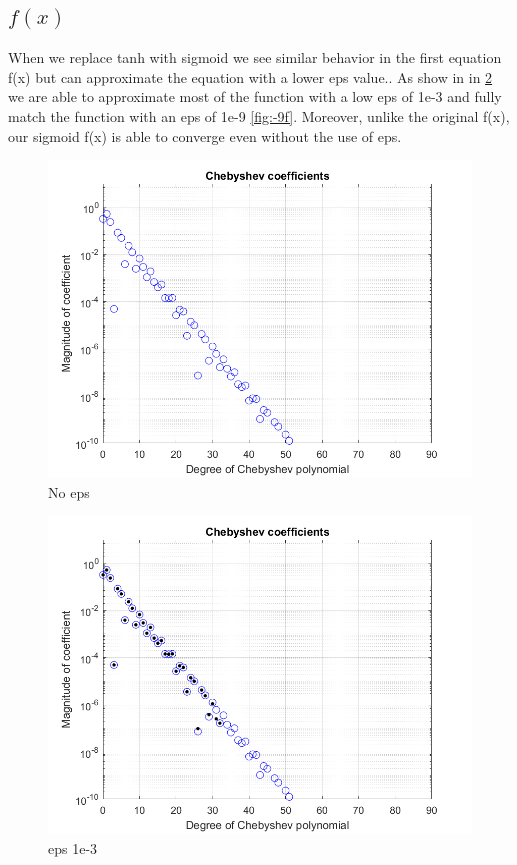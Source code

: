 \documentclass{article}
\begin{document}
\subsection{$f(x) $}
When we replace tanh with sigmoid we see similar behavior in the first equation f(x) but can approximate the equation with a lower eps value.. As show in in \ref{fig:-3f} we are able to approximate most of the function with a low eps of 1e-3 and fully match the function with an eps of 1e-9 \ref{fig:-9f}. Moreover, unlike the original f(x), our sigmoid f(x) is able to converge even without the use of eps. 
\begin{figure}[h!]
\centering
\includegraphics[scale=.5]{fnone.png}
\caption{No eps}
\label{fig:fnone}
\end{figure}

\begin{figure}[h]
\centering
\includegraphics[scale=.5]{-3f.png}
\caption{eps 1e-3}
\label{fig:-3f}
\end{figure}
\end{document}

